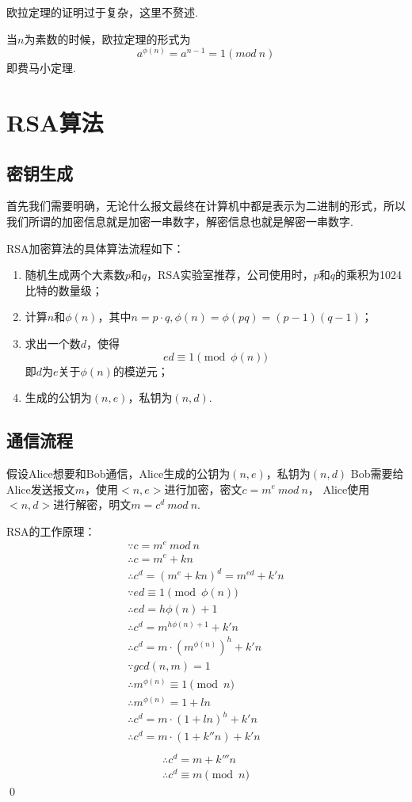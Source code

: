 \documentclass[UTF8]{ctexart}
\begin{document}
欧拉定理的证明过于复杂，这里不赘述.

当$n$为素数的时候，欧拉定理的形式为
\[
	a^{\phi(n)} = a^{n-1} = 1 (mod \ n)
\]
即费马小定理.

\section{RSA算法}

\subsection{密钥生成}
首先我们需要明确，无论什么报文最终在计算机中都是表示为二进制的形式，所以我们所谓的加密信息就是加密一串数字，解密信息也就是解密一串数字.

RSA加密算法的具体算法流程如下：
\begin{enumerate}
	\item 随机生成两个大素数$p$和$q$，RSA实验室推荐，公司使用时，$p$和$q$的乘积为1024比特的数量级；
	\item 计算$n$和$\phi(n)$，其中$n = p \cdot q, \phi(n) = \phi(pq) = (p-1)(q-1)$；
	\item 求出一个数$d$，使得
	      \[
		      ed \equiv 1 \pmod{\phi(n)}
	      \]
	      即$d$为$e$关于$\phi(n)$的模逆元；
	\item 生成的公钥为$(n, e)$，私钥为$(n, d)$.
\end{enumerate}

\subsection{通信流程}
假设Alice想要和Bob通信，Alice生成的公钥为$(n,e)$，私钥为$(n,d)$
Bob需要给Alice发送报文$m$，使用$<n,e>$进行加密，密文$c = m^ e \ mod \ n$，
Alice使用$<n,d>$进行解密，明文$m = c^d \  mod \ n$.

RSA的工作原理：
\begin{gather*}
	\because c = m^e \ mod \ n\\
	\therefore c = m^e + kn \tag{k is a constant}\\
	\therefore c^d = (m^e + kn) ^d = m^{ed} + k'n \tag{k' is a constant}\\
	\because ed \equiv 1\pmod{\phi(n)}\\
	\therefore ed = h\phi(n) + 1 \tag{h is a constant}\\
	\therefore c^d  = m^{h\phi(n)+1} + k'n\\
	\therefore c^d = m \cdot (m ^{\phi(n)})^h + k'n\\
	\because gcd(n,m) = 1\\
	\therefore m^{\phi(n)} \equiv 1\pmod{n} \tag{Euler Theroem}\\
	\therefore m^{\phi(n)} = 1 + ln \tag{l is a constant}\\
	\therefore  c^d = m \cdot (1 + ln)^h + k'n\\
	\therefore c^d = m \cdot (1+k''n) + k'n \tag{k'' is a constant}\\
\end{gather*}
\begin{gather*}
	\therefore c^d = m + k'''n \tag{k''' is a constant}\\
    \therefore c^d \equiv m \pmod{n}
\end{gather*}
\qed
\end{document}
